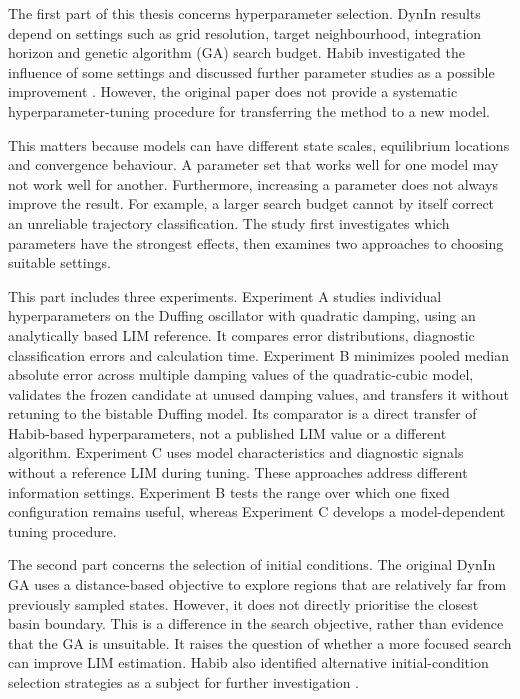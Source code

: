 The first part of this thesis concerns hyperparameter selection. DynIn results depend on settings such as grid resolution, target neighbourhood, integration horizon and genetic algorithm (GA) search budget. Habib investigated the influence of some settings and discussed further parameter studies as a possible improvement \cite{ref12}. However, the original paper does not provide a systematic hyperparameter-tuning procedure for transferring the method to a new model.

\begin{revision}
This matters because models can have different state scales, equilibrium locations and convergence behaviour. A parameter set that works well for one model may not work well for another. Furthermore, increasing a parameter does not always improve the result. For example, a larger search budget cannot by itself correct an unreliable trajectory classification. The study first investigates which parameters have the strongest effects, then examines two approaches to choosing suitable settings.
\end{revision}

\begin{bluerevision}
This part includes three experiments. Experiment A studies individual hyperparameters on the Duffing oscillator with quadratic damping, using an analytically based LIM reference. It compares error distributions, diagnostic classification errors and calculation time. Experiment B minimizes pooled median absolute error across multiple damping values of the quadratic-cubic model, validates the frozen candidate at unused damping values, and transfers it without retuning to the bistable Duffing model. Its comparator is a direct transfer of Habib-based hyperparameters, not a published LIM value or a different algorithm. Experiment C uses model characteristics and diagnostic signals without a reference LIM during tuning. These approaches address different information settings. Experiment B tests the range over which one fixed configuration remains useful, whereas Experiment C develops a model-dependent tuning procedure.
\end{bluerevision}

The second part concerns the selection of initial conditions. The original DynIn GA uses a distance-based objective to explore regions that are relatively far from previously sampled states. However, it does not directly prioritise the closest basin boundary. This is a difference in the search objective, rather than evidence that the GA is unsuitable. It raises the question of whether a more focused search can improve LIM estimation. Habib also identified alternative initial-condition selection strategies as a subject for further investigation \cite{ref12}.

